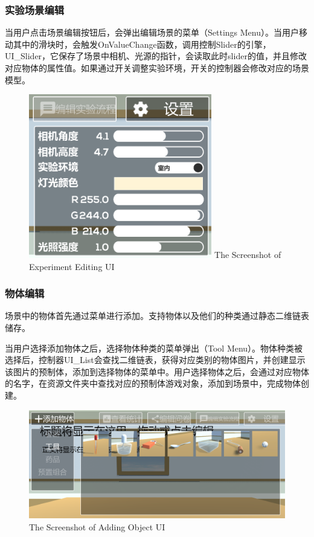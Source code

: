 \subsubsection{实验场景编辑}
当用户点击场景编辑按钮后，会弹出编辑场景的菜单（Settings Menu）。当用户移动其中的滑块时，会触发OnValueChange函数，调用控制Slider的引擎，UI\_Slider，它保存了场景中相机、光源的指针，会读取此时slider的值，并且修改对应物体的属性值。如果通过开关调整实验环境，开关的控制器会修改对应的场景模型。

\begin{figure}[!htp]
  \centering
  \includegraphics[width=8cm]{figure/settings.png}
    {The Screenshot of Experiment Editing UI}
 \label{fig:gm}
\end{figure}

\subsubsection{物体编辑}
场景中的物体首先通过菜单进行添加。支持物体以及他们的种类通过静态二维链表储存。

	当用户选择添加物体之后，选择物体种类的菜单弹出（Tool Menu）。物体种类被选择后，控制器UI\_List会查找二维链表，获得对应类别的物体图片，并创建显示该图片的预制体，添加到选择物体的菜单中。用户选择物体之后，会通过对应物体的名字，在资源文件夹中查找对应的预制体游戏对象，添加到场景中，完成物体创建。
	
\begin{figure}[!htp]
  \centering
  \includegraphics[width=12cm]{figure/addObj.png}
    {The Screenshot of Adding Object UI}
 \label{fig:gm}
\end{figure}

